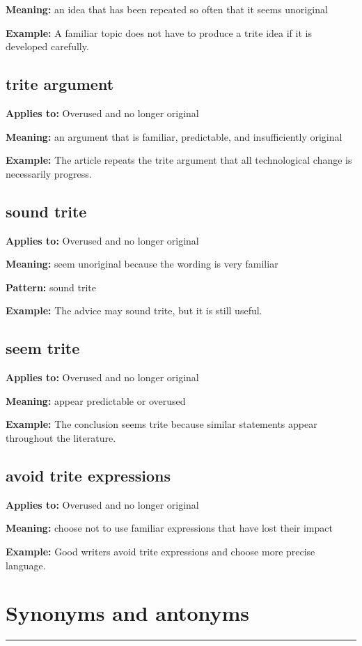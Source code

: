 \documentclass[11pt]{article}
\newcommand{\sectionrule}{\par\vspace{-0.5em}\noindent\textcolor{Accent}{\rule{\linewidth}{0.6pt}}\par}
\begin{document}
\textbf{Meaning:} an idea that has been repeated so often that it seems unoriginal

\textbf{Example:} A familiar topic does not have to produce a trite idea if it is developed carefully.

\subsection{trite argument}
\textbf{Applies to:} Overused and no longer original

\textbf{Meaning:} an argument that is familiar, predictable, and insufficiently original

\textbf{Example:} The article repeats the trite argument that all technological change is necessarily progress.

\subsection{sound trite}
\textbf{Applies to:} Overused and no longer original

\textbf{Meaning:} seem unoriginal because the wording is very familiar

\textbf{Pattern:} sound trite

\textbf{Example:} The advice may sound trite, but it is still useful.

\subsection{seem trite}
\textbf{Applies to:} Overused and no longer original

\textbf{Meaning:} appear predictable or overused

\textbf{Example:} The conclusion seems trite because similar statements appear throughout the literature.

\subsection{avoid trite expressions}
\textbf{Applies to:} Overused and no longer original

\textbf{Meaning:} choose not to use familiar expressions that have lost their impact

\textbf{Example:} Good writers avoid trite expressions and choose more precise language.

\section{Synonyms and antonyms}
\sectionrule
\end{document}

